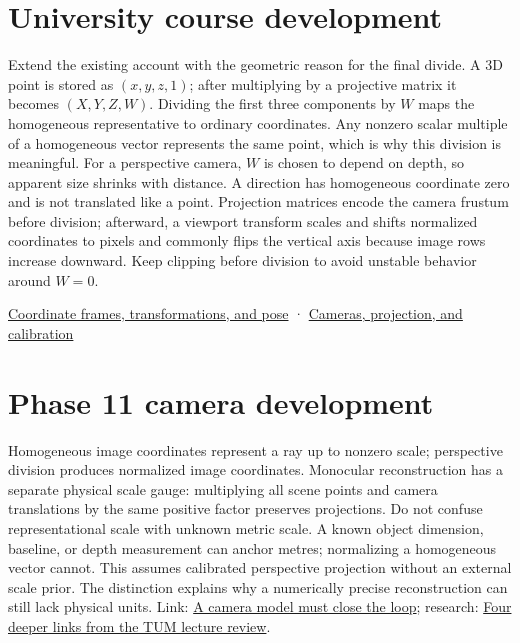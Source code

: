\section{University course development}\label{appendix-cb3b26862282-university-course-development}

Extend the existing account with the geometric reason for the final divide. A 3D point is stored as \((x,y,z,1)\); after multiplying by a projective matrix it becomes \((X,Y,Z,W)\). Dividing the first three components by \(W\) maps the homogeneous representative to ordinary coordinates. Any nonzero scalar multiple of a homogeneous vector represents the same point, which is why this division is meaningful. For a perspective camera, \(W\) is chosen to depend on depth, so apparent size shrinks with distance. A direction has homogeneous coordinate zero and is not translated like a point. Projection matrices encode the camera frustum before division; afterward, a viewport transform scales and shifts normalized coordinates to pixels and commonly flips the vertical axis because image rows increase downward. Keep clipping before division to avoid unstable behavior around \(W=0\).

\href{Continuous\%20Notes/University\%20-\%20Worlds,\%20Images\%20and\%20Inference\%20-\%20Graphics,\%20Vision\%20and\%20Photography\#Coordinate\%20frames,\%20transformations,\%20and\%20pose}{Coordinate frames, transformations, and pose} · \href{Continuous\%20Notes/University\%20-\%20Worlds,\%20Images\%20and\%20Inference\%20-\%20Graphics,\%20Vision\%20and\%20Photography\#Cameras,\%20projection,\%20and\%20calibration}{Cameras, projection, and calibration}

\section{Phase 11 camera development}\label{appendix-cb3b26862282-phase-11-camera-development}

Homogeneous image coordinates represent a ray up to nonzero scale; perspective division produces normalized image coordinates. Monocular reconstruction has a separate physical scale gauge: multiplying all scene points and camera translations by the same positive factor preserves projections. Do not confuse representational scale with unknown metric scale. A known object dimension, baseline, or depth measurement can anchor metres; normalizing a homogeneous vector cannot. This assumes calibrated perspective projection without an external scale prior. The distinction explains why a numerically precise reconstruction can still lack physical units. Link: \href{Continuous\%20Notes/Computing\%20Foundations\%20-\%20From\%20Bits\%20to\%20C++\%20and\%20Systems\%20APIs\#A\%20camera\%20model\%20must\%20close\%20the\%20loop}{A camera model must close the loop}; research: \href{Continuous\%20Notes/Computing\%20Foundations\%20-\%20From\%20Bits\%20to\%20C++\%20and\%20Systems\%20APIs\#Four\%20deeper\%20links\%20from\%20the\%20TUM\%20lecture\%20review}{Four deeper links from the TUM lecture review}.
